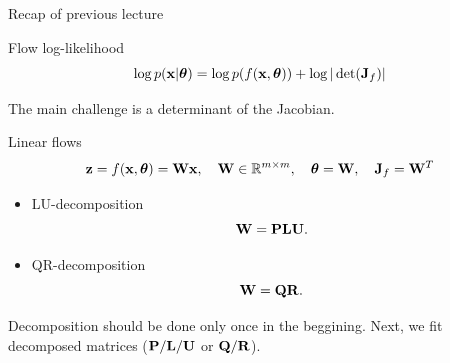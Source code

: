 \begin{frame}{Recap of previous lecture}
	\vspace{-0.5cm}
	\begin{block}{Flow log-likelihood}
		\vspace{-0.3cm}
		\[
			\log p(\mathbf{x}|\boldsymbol{\theta}) = \log p(f(\mathbf{x}, \boldsymbol{\theta})) + \log  |\det (\mathbf{J}_f)|
		\]
		\vspace{-0.5cm}
	\end{block}
	The main challenge is a determinant of the Jacobian.
	\begin{block}{Linear flows}	
		\vspace{-0.2cm}
		\[
			\mathbf{z} = f(\mathbf{x}, \boldsymbol{\theta}) = \mathbf{W} \mathbf{x}, \quad \mathbf{W} \in \mathbb{R}^{m \times m}, \quad \boldsymbol{\theta} = \mathbf{W}, \quad \mathbf{J}_f = \mathbf{W}^T
		\]
	\end{block}
	\vspace{-0.3cm}
	\begin{itemize}
		\item LU-decomposition
		\[
			\mathbf{W} = \mathbf{P} \mathbf{L} \mathbf{U}.
		\]
		\item QR-decomposition
		\[
			\mathbf{W} = \mathbf{Q} \mathbf{R}.
		\]
	\end{itemize}
	Decomposition should be done only once in the beggining. Next, we fit decomposed matrices ($\mathbf{P}/\mathbf{L}/\mathbf{U}$ or $\mathbf{Q}/\mathbf{R}$).
\end{frame}
